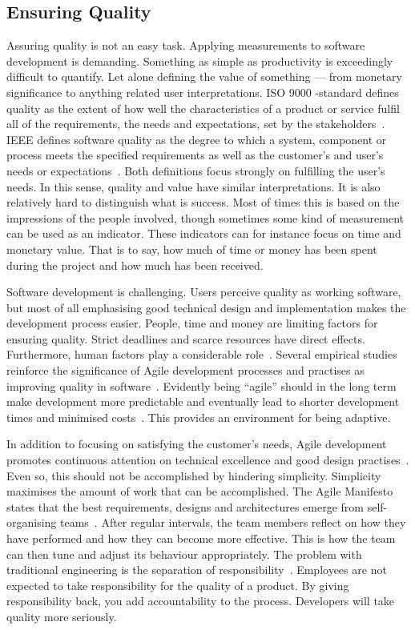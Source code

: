 \documentclass[english]{tktltiki2}
\begin{document}
\subsection{Ensuring Quality}

Assuring quality is not an easy task. Applying measurements to software development is demanding. Something as simple as productivity is exceedingly difficult to quantify. Let alone defining the value of something — from monetary significance to anything related user interpretations. ISO 9000 -standard defines quality as the extent of how well the characteristics of a product or service fulfil all of the requirements, the needs and expectations, set by the stakeholders~\cite{ISO9000}. IEEE defines software quality as the degree to which a system, component or process meets the specified requirements as well as the customer’s and user’s needs or expectations~\cite{IEEE1074}. Both definitions focus strongly on fulfilling the user’s needs. In this sense, quality and value have similar interpretations. It is also relatively hard to distinguish what is success. Most of times this is based on the impressions of the people involved, though sometimes some kind of measurement can be used as an indicator. These indicators can for instance focus on time and monetary value. That is to say, how much of time or money has been spent during the project and how much has been received.

Software development is challenging. Users perceive quality as working software, but most of all emphasising good technical design and implementation makes the development process easier. People, time and money are limiting factors for ensuring quality. Strict deadlines and scarce resources have direct effects. Furthermore, human factors play a considerable role~\cite{DD08}. Several empirical studies reinforce the significance of Agile development processes and practises as improving quality in software~\cite{DD08, SS10, DNB12}. Evidently being “agile” should in the long term make development more predictable and eventually lead to shorter development times and minimised costs~\cite{DD08}. This provides an environment for being adaptive.

In addition to focusing on satisfying the customer’s needs, Agile development promotes continuous attention on technical excellence and good design practises~\cite{BBB01b}. Even so, this should not be accomplished by hindering simplicity. Simplicity maximises the amount of work that can be accomplished. The Agile Manifesto states that the best requirements, designs and architectures emerge from self-organising teams~\cite{BBB01b}. After regular intervals, the team members reflect on how they have performed and how they can become more effective. This is how the team can then tune and adjust its behaviour appropriately. The problem with traditional engineering is the separation of responsibility~\cite{Pop02}. Employees are not expected to take responsibility for the quality of a product. By giving responsibility back, you add accountability to the process. Developers will take quality more seriously.
\end{document}
